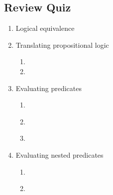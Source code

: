 \subsection*{Review Quiz}
\begin{enumerate}
\item Logical equivalence
 
\item Translating propositional logic
    \begin{enumerate}
    \item 
    \newpage
    \item 
    \end{enumerate}
\newpage
\item Evaluating predicates
    \begin{enumerate}
    \item \hspace{1in}\\ 
    \item \hspace{1in}\\ 
    \item \hspace{1in}\\ 
    \end{enumerate}
\newpage
\item Evaluating nested predicates
    \begin{enumerate}
    \item \hspace{1in}\\
    \item \hspace{1in}\\
    \end{enumerate}
\end{enumerate}

\newpage
